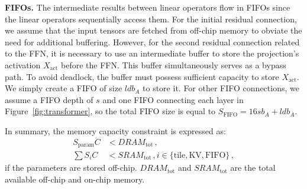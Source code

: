 \textbf{FIFOs.}
The intermediate results between linear operators flow in FIFOs since the linear operators sequentially access them.
For the initial residual connection, we assume that the input tensors are fetched from off-chip memory to obviate the need for additional buffering. 
However, for the second residual connection related to the FFN, it is necessary to use an intermediate buffer to store the projection's activation $X_{\text{act}}$ before the FFN. 
This buffer simultaneously serves as a bypass path.
To avoid deadlock, the buffer must possess sufficient capacity to store $X_{\text{act}}$.
We simply create a FIFO of size $ldb_{A}$ to store it.
For other FIFO connections, we assume a FIFO depth of $s$ and one FIFO connecting each layer in Figure~\ref{fig:transformer}, so the total FIFO size is equal to $S_{\text{FIFO}}=16sb_{A}+ldb_A$.

In summary, the memory capacity constraint is expressed as:
\begin{equation}
\label{eq:sram_constraint}
\begin{aligned}
    S_{\text{param}}C &< DRAM_{\text{tot}}\,,\\
    \sum S_iC &< SRAM_{\text{tot}}\,, i\in\{\text{tile},\text{KV},\text{FIFO}\}\,,
\end{aligned}
\end{equation}
if the parameters are stored off-chip.
$DRAM_{\text{tot}}$ and $SRAM_{\text{tot}}$ are the total available off-chip and on-chip memory.

